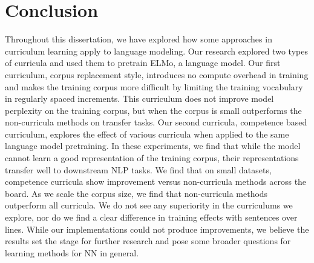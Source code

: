 \chapter{Conclusion}
\label{chap:conclusion}
Throughout this dissertation, we have explored how some approaches in curriculum learning apply to language modeling. Our research explored two types of curricula and used them to pretrain ELMo, a language model. Our first curriculum, corpus replacement style, introduces no compute overhead in training and makes the training corpus more difficult by limiting the training vocabulary in regularly spaced increments. This curriculum does not improve model perplexity on the training corpus, but when the corpus is small outperforms the non-curricula methods on transfer tasks. Our second curricula, competence based curriculum, explores the effect of various curricula when applied to the same language model pretraining. In these experiments, we find that while the model cannot learn a good representation of the training corpus, their representations transfer well to downstream NLP tasks. We find that on small datasets, competence curricula show improvement versus non-curricula methods across the board. As we scale the corpus size, we find that non-curricula methods outperform all curricula. We do not see any superiority in the curriculums we explore, nor do we find a clear difference in training effects with sentences over lines. While our implementations could not produce improvements, we believe the results set the stage for further research and pose some broader questions for learning methods for NN in general. 